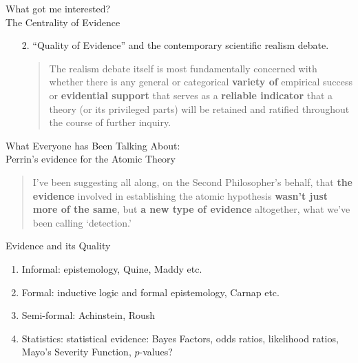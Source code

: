 \documentclass{beamer}
\begin{document}
\begin{frame}{What got me interested? \\ The Centrality of Evidence}

\begin{enumerate}

\item[2.] ``Quality of Evidence'' and the contemporary scientific realism debate.
\vfill
\begin{quote}
The realism debate itself is most fundamentally concerned with whether there is any general or categorical \textbf{variety of} empirical success or \textbf{evidential support} that serves as a \textbf{reliable indicator} that a theory (or its privileged parts) will be retained and ratified throughout the course of further inquiry.

\citet{Stanford2021}
\end{quote}

\end{enumerate}
\end{frame}

	\begin{frame}{What Everyone has Been Talking About: \\ Perrin's evidence for the Atomic Theory}
		 \begin{quote}
I've been suggesting all along, on the Second Philosopher's behalf, that \textbf{the evidence} involved in establishing the atomic hypothesis \textbf{wasn't just more of the same}, but \textbf{a new type of evidence} altogether, what we've been calling `detection.'

\citet[405]{Maddy2007}
		\end{quote}
	\end{frame}
  

	\begin{frame}{Evidence and its Quality}

	\begin{enumerate}

		\item Informal: epistemology, Quine, Maddy etc.
		\vfill
		\item Formal: inductive logic and formal epistemology, Carnap etc.
		\vfill
		\item Semi-formal: Achinstein, Roush
		\vfill
		\item \alert{Statistics: statistical evidence}: Bayes Factors, odds ratios, likelihood ratios, Mayo's Severity Function, $p$-values?

\end{enumerate}

\end{frame}
\end{document}

